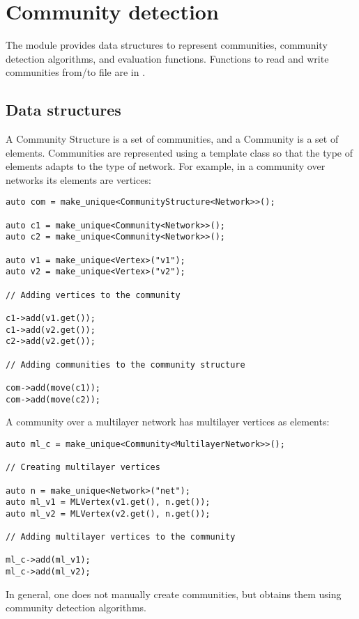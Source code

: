 \chapter{Community detection} \label{ch:community}

The  module provides data structures to represent communities, community detection algorithms, and evaluation functions.
Functions to read and write communities from/to file are in . 

\section{Data structures}

A Community Structure is a set of communities, and a Community is a set of elements. Communities are represented using a template class so that the type of elements adapts to the type of network. For example, in a community over networks its elements are vertices:
\begin{lstlisting}[style=c++]
auto com = make_unique<CommunityStructure<Network>>();

auto c1 = make_unique<Community<Network>>();
auto c2 = make_unique<Community<Network>>();

auto v1 = make_unique<Vertex>("v1");
auto v2 = make_unique<Vertex>("v2");

// Adding vertices to the community

c1->add(v1.get());
c1->add(v2.get());
c2->add(v2.get());

// Adding communities to the community structure

com->add(move(c1));
com->add(move(c2));
\end{lstlisting}

A community over a multilayer network has multilayer vertices as elements:
\begin{lstlisting}[style=c++]
auto ml_c = make_unique<Community<MultilayerNetwork>>();

// Creating multilayer vertices

auto n = make_unique<Network>("net");
auto ml_v1 = MLVertex(v1.get(), n.get());
auto ml_v2 = MLVertex(v2.get(), n.get());

// Adding multilayer vertices to the community

ml_c->add(ml_v1);
ml_c->add(ml_v2);
\end{lstlisting}

In general, one does not manually create communities, but obtains them using community detection algorithms.

